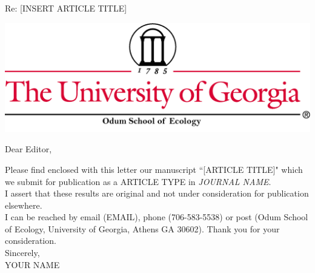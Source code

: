\documentclass{letter}
\begin{document}
 
\begin{letter} {Re:  [INSERT ARTICLE TITLE]} %

\includegraphics[width=\textwidth]{thin4codum.png}




\opening{Dear Editor, }

Please find enclosed with this letter our manuscript ``[ARTICLE TITLE]" which we submit for publication as a ARTICLE TYPE in \textit{JOURNAL NAME}.\\







I assert that these results are original and not under consideration for publication elsewhere.\\


I can be reached by email (EMAIL), phone (706-583-5538) or post (Odum School of Ecology, University of Georgia, Athens GA 30602). Thank you for your consideration.\\

Sincerely,\\

YOUR NAME



\end{letter}
\end{document}
